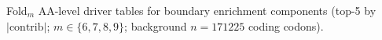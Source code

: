 Fold$_m$ AA-level driver tables for boundary enrichment components (top-5 by $|\mathrm{contrib}|$; $m\in\{6,7,8,9\}$; background $n=171225$ coding codons).
